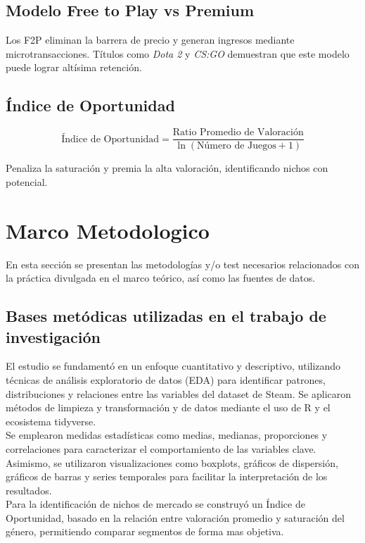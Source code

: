 \documentclass[oneside,11pt]{Latex/Classes/PhDthesisPSnPDF}
\begin{document}
\section{Modelo Free to Play vs Premium}

Los F2P eliminan la barrera de precio y generan ingresos mediante
microtransacciones. Títulos como \textit{Dota 2} y \textit{CS:GO}
demuestran que este modelo puede lograr altísima retención.

\section{Índice de Oportunidad}

\[\text{Índice de Oportunidad} = \frac{\text{Ratio Promedio de Valoración}}{\ln(\text{Número de Juegos} + 1)}\]

Penaliza la saturación y premia la alta valoración, identificando nichos
con potencial.

\chapter{Marco Metodologico}

En esta sección se presentan las metodologías y/o test necesarios
relacionados con la práctica divulgada en el marco teórico, así como las
fuentes de datos.

\section{Bases metódicas utilizadas en el trabajo de investigación}

El estudio se fundamentó en un enfoque cuantitativo y descriptivo,
utilizando técnicas de análisis exploratorio de datos (EDA) para
identificar patrones, distribuciones y relaciones entre las variables
del dataset de Steam. Se aplicaron métodos de limpieza y transformación
y de datos mediante el uso de R y el ecosistema tidyverse.\\

Se emplearon medidas estadísticas como medias, medianas, proporciones y
correlaciones para caracterizar el comportamiento de las variables
clave. Asimismo, se utilizaron visualizaciones como boxplots, gráficos
de dispersión, gráficos de barras y series temporales para facilitar la
interpretación de los resultados.\\

Para la identificación de nichos de mercado se construyó un Índice de
Oportunidad, basado en la relación entre valoración promedio y
saturación del género, permitiendo comparar segmentos de forma mas
objetiva.\\
\end{document}
